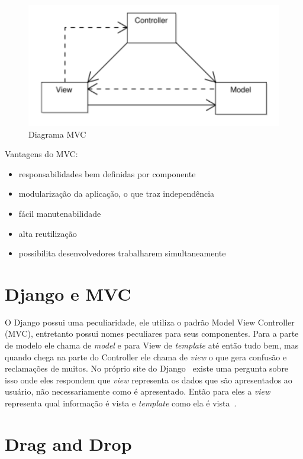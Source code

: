 \documentclass[a4paper, 12pt, oneside]{book}
\begin{document}
\begin{figure}[H]
\centering
\includegraphics[scale=0.4]{mvc.png}
\caption{Diagrama MVC \cite{mvc-murta}}
\label{fig:mvc}
\end{figure}

Vantagens do MVC:
\begin{itemize}
\item responsabilidades bem definidas por componente
\item modularização da aplicação, o que traz independência 
\item fácil manutenabilidade
\item alta reutilização
\item possibilita desenvolvedores trabalharem simultaneamente
\end{itemize}

\section{Django e MVC}
O Django possui uma peculiaridade, ele utiliza o padrão Model View Controller (MVC), entretanto possui nomes peculiares para seus componentes. Para a parte de modelo ele chama de \textit{model} e para View de \textit{template} até então tudo bem, mas quando chega na parte do Controller ele chama de \textit{view} o que gera confusão e reclamações de muitos. No próprio site do Django~\cite{django} existe uma pergunta sobre isso onde eles respondem que \textit{view} representa os dados que são apresentados ao usuário, não necessariamente como é apresentado. Então para eles a \textit{view} representa qual informação é vista e \textit{template} como ela é vista~\cite{django-mvc}.

\section{Drag and Drop}
\end{document}
